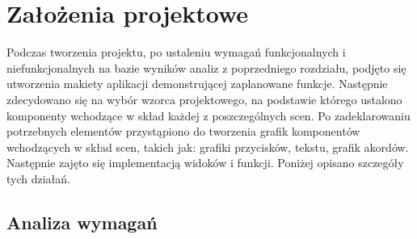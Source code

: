 \chapter{Założenia projektowe}

Podczas tworzenia projektu, po ustaleniu wymagań funkcjonalnych i niefunkcjonalnych na bazie wyników analiz z poprzedniego rozdziału, 
podjęto się utworzenia makiety aplikacji demonstrującej zaplanowane funkcje. Następnie zdecydowano się na wybór wzorca projektowego, na podstawie którego ustalono komponenty wchodzące w skład każdej z poszczególnych scen. Po zadeklarowaniu potrzebnych elementów przystąpiono do tworzenia grafik komponentów wchodzących w skład scen, takich jak: grafiki przycisków, tekstu, grafik akordów. Następnie zajęto się implementacją widoków i funkcji. Poniżej opisano szczegóły tych działań.

\section{Analiza wymagań}
